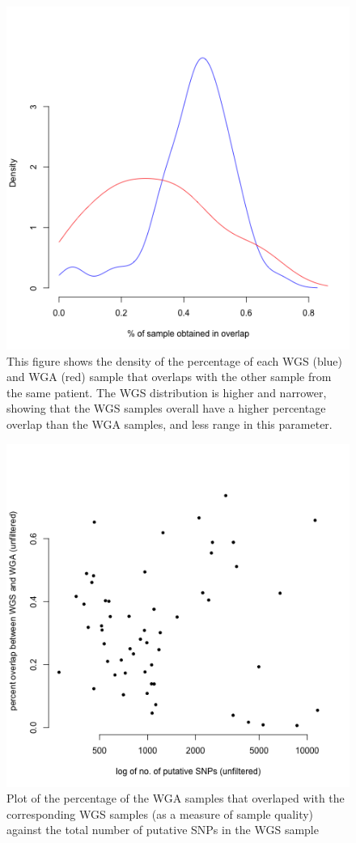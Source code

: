 \documentclass[11pt]{article} %
\begin{document}
\begin{figure}
\includegraphics[scale=1.0]{unfiltered_overlap_WGS_WGA_together_densities.png}
\caption{This figure shows the density of the percentage of each WGS (blue) and WGA (red) sample that overlaps with the other sample from the same patient. The WGS distribution is higher and narrower, showing that the WGS samples overall have a higher percentage overlap than the WGA samples, and less range in this parameter. }
\end{figure}

\begin{figure}
\includegraphics[scale=1.0]{unfiltered_total_muts_v_percent_overlap.png}
\caption{Plot of the percentage of the WGA samples that overlaped with the corresponding WGS samples (as a measure of sample quality) against the total number of putative SNPs in the WGS sample}
\end{figure}



\end{document}
